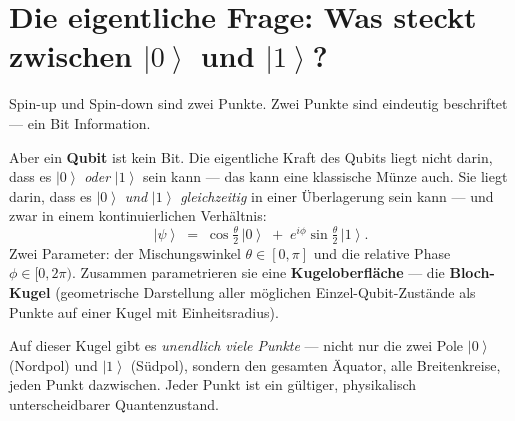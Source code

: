 
\providecommand{\ket}[1]{\left|#1\right\rangle}
\providecommand{\bra}[1]{\left\langle#1\right|}
\providecommand{\braket}[2]{\left\langle#1\middle|#2\right\rangle}

\section{Die eigentliche Frage: Was steckt zwischen \texorpdfstring{$\ket{0}$}{|0>}
  und \texorpdfstring{$\ket{1}$}{|1>}?}
\label{sec:zwischen}

Spin-up und Spin-down sind zwei Punkte.
Zwei Punkte sind eindeutig beschriftet --- ein Bit Information.

Aber ein \textbf{Qubit} ist kein Bit.
Die eigentliche Kraft des Qubits liegt nicht darin,
dass es $\ket{0}$ \emph{oder} $\ket{1}$ sein kann ---
das kann eine klassische Münze auch.
Sie liegt darin, dass es $\ket{0}$ \emph{und} $\ket{1}$
\emph{gleichzeitig} in einer Überlagerung sein kann ---
und zwar in einem kontinuierlichen Verhältnis:
\begin{equation}
  \ket{\psi} \;=\; \cos\!\tfrac{\theta}{2}\,\ket{0}
  \;+\; e^{i\phi}\sin\!\tfrac{\theta}{2}\,\ket{1}.
\end{equation}
Zwei Parameter: der Mischungswinkel $\theta \in [0,\pi]$
und die relative Phase $\phi \in [0, 2\pi)$.
Zusammen parametrieren sie eine \textbf{Kugeloberfläche} ---
die \textbf{Bloch-Kugel} (geometrische Darstellung
aller möglichen Einzel-Qubit-Zustände als Punkte
auf einer Kugel mit Einheitsradius).

Auf dieser Kugel gibt es \emph{unendlich viele Punkte} ---
nicht nur die zwei Pole $\ket{0}$ (Nordpol) und
$\ket{1}$ (Südpol), sondern den gesamten Äquator,
alle Breitenkreise, jeden Punkt dazwischen.
Jeder Punkt ist ein gültiger, physikalisch
unterscheidbarer Quantenzustand.

